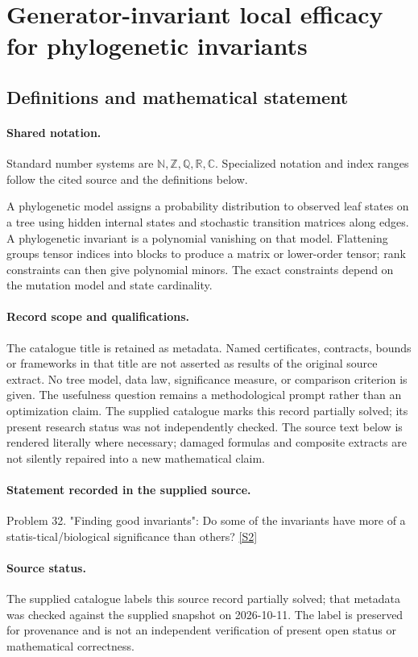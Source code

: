 \documentclass[11pt]{article}
\newcommand{\sref}[2]{\hyperlink{source:#1:#2}{[S#2]}}
\begin{document}
\section{Generator-invariant local efficacy for phylogenetic invariants}\label{statement}

\subsection{Definitions and mathematical statement}

\paragraph{Shared notation.}Standard number systems are $\mathbb N,\mathbb Z,\mathbb Q,\mathbb R,\mathbb C$. Specialized notation and index ranges follow the cited source and the definitions below.


A phylogenetic model assigns a probability distribution to observed leaf states on a tree using hidden internal states and stochastic transition matrices along edges. A phylogenetic invariant is a polynomial vanishing on that model. Flattening groups tensor indices into blocks to produce a matrix or lower-order tensor; rank constraints can then give polynomial minors. The exact constraints depend on the mutation model and state cardinality.
\paragraph{Record scope and qualifications.}
The catalogue title is retained as metadata. Named certificates, contracts, bounds or frameworks in that title are not asserted as results of the original source extract.
No tree model, data law, significance measure, or comparison criterion is given. The usefulness question remains a methodological prompt rather than an optimization claim. The supplied catalogue marks this record partially solved; its present research status was not independently checked.
The source text below is rendered literally where necessary; damaged formulas and composite extracts are not silently repaired into a new mathematical claim.
\paragraph{Statement recorded in the supplied source.}
Problem 32. "Finding good invariants": Do some of the invariants have more of a statis-tical/biological significance than others? \sref{statement}{2}
\paragraph{Source status.}
The supplied catalogue labels this source record partially solved; that metadata was checked against the supplied snapshot on 2026-10-11. The label is preserved for provenance and is not an independent verification of present open status or mathematical correctness.
\end{document}
